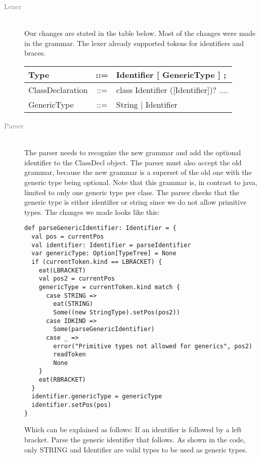 \begin{description}
\item[\textcolor{Gray}{Lexer}] \hfill \\
Our changes are stated in the table below. Most of the changes were made in the grammar. The lexer already supported tokens for identifiers and braces.

\begin{table}[h!]
  \begin{tabular}{|l|c|p{4.1cm}|}
    \hline
    Type             & ::= & Identifier [ GenericType ] ;          \\ \hline
    ClassDeclaration & ::= & class Identifier \newline ([Identifier])? .... \\ \hline
    GenericType      & ::= & String $\vert$ Identifier   \\ \hline
  \end{tabular}
\end{table}

\item[\textcolor{Gray}{Parser}] \hfill \\
The parser needs to recognize the new grammar and add the optional identifier to the ClassDecl object. The parser must also accept the old grammar, because the new grammar is a superset of the old one with the generic type being optional. Note that this grammar is, in contrast to java, limited to only one generic type per class. The parser checks that the generic type is either identifier or string since we do not allow primitive types. The changes we made looks like this:

\begin{lstlisting}
def parseGenericIdentifier: Identifier = {
  val pos = currentPos
  val identifier: Identifier = parseIdentifier
  var genericType: Option[TypeTree] = None
  if (currentToken.kind == LBRACKET) {
    eat(LBRACKET)
    val pos2 = currentPos
    genericType = currentToken.kind match {
      case STRING =>
        eat(STRING)
        Some((new StringType).setPos(pos2))
      case IDKIND =>
        Some(parseGenericIdentifier)
      case _ =>
        error("Primitive types not allowed for generics", pos2)
        readToken
        None
    }
    eat(RBRACKET)
  }
  identifier.genericType = genericType
  identifier.setPos(pos)
}
\end{lstlisting}

Which can be explained as follows: If an identifier is followed by a left bracket. Parse the generic identifier that follows. As shown in the code, only STRING and Identifier are valid types to be used as generic types.


\end{description}
